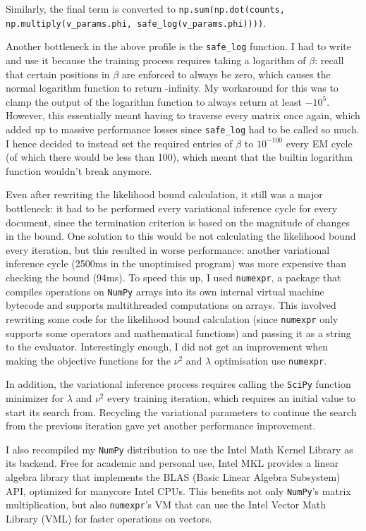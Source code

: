 \documentclass[12pt,a4paper,twoside,openright]{report}
\begin{document}
Similarly, the final term is converted to \texttt{np.sum(np.dot(counts, np.multiply(v\_params.phi, safe\_log(v\_params.phi))))}.

Another bottleneck in the above profile is the \texttt{safe\_log} function. I had to write and use it because the training process requires taking a logarithm of $\beta$: recall that certain positions in $\beta$ are enforced to always be zero, which causes the normal logarithm function to return -infinity. My workaround for this was to clamp the output of the logarithm function to always return at least $-10^5$. However, this essentially meant having to traverse every matrix once again, which added up to massive performance losses since \texttt{safe\_log} had to be called so much. I hence decided to instead set the required entries of $\beta$ to $10^{-100}$ every EM cycle (of which there would be less than 100), which meant that the builtin logarithm function wouldn't break anymore.

Even after rewriting the likelihood bound calculation, it still was a major bottleneck: it had to be performed every variational inference cycle for every document, since the termination criterion is based on the magnitude of changes in the bound. One solution to this would be not calculating the likelihood bound every iteration, but this resulted in worse performance: another variational inference cycle (2500ms in the unoptimised program) was more expensive than checking the bound (94ms). To speed this up, I used \texttt{numexpr}, a package that compiles operations on \texttt{NumPy} arrays into its own internal virtual machine bytecode and supports multithreaded computations on arrays. This involved rewriting some code for the likelihood bound calculation (since \texttt{numexpr} only supports some operators and mathematical functions) and passing it as a string to the evaluator. Interestingly enough, I did not get an improvement when making the objective functions for the $\nu^2$ and $\lambda$ optimisation use \texttt{numexpr}.

In addition, the variational inference process requires calling the \texttt{SciPy} function minimizer for $\lambda$ and $\nu^2$ every training iteration, which requires an initial value to start its search from. Recycling the variational parameters to continue the search from the previous iteration gave yet another performance improvement.

I also recompiled my \texttt{NumPy} distribution to use the Intel Math Kernel Library as its backend. Free for academic and personal use, Intel MKL provides a linear algebra library that implements the BLAS (Basic Linear Algebra Subsystem) API, optimized for manycore Intel CPUs. This benefits not only \texttt{NumPy}'s matrix multiplication, but also \texttt{numexpr}'s VM that can use the Intel Vector Math Library (VML) for faster operations on vectors.
\end{document}
